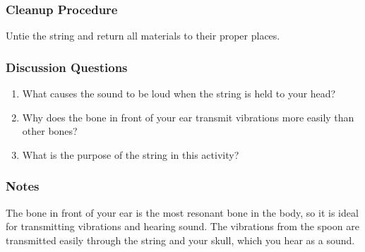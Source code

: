 \subsubsection*{Cleanup Procedure}
Untie the string and return all materials to their proper places.

\subsubsection*{Discussion Questions}
\begin{enumerate}
\item{What causes the sound to be loud when the string is held to your head?}
\item{Why does the bone in front of your ear transmit vibrations more easily than other bones?}
\item{What is the purpose of the string in this activity?}
\end{enumerate}

\subsubsection*{Notes}
The bone in front of your ear is the most resonant bone in the body, so it is ideal for transmitting vibrations and hearing sound.  The vibrations from the spoon are transmitted easily through the string and your skull, which you hear as a sound.




